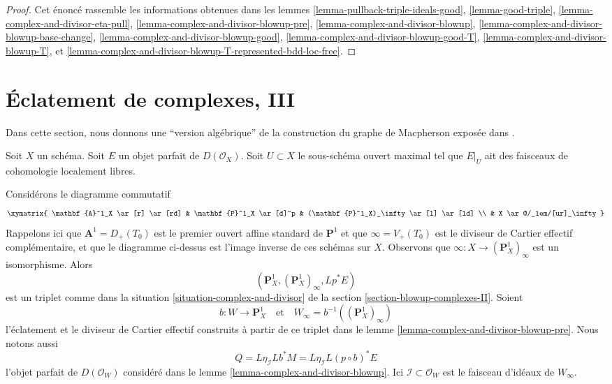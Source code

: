 \begin{proof}
Cet énoncé rassemble les informations obtenues dans les
lemmes \ref{lemma-pullback-triple-ideals-good},
\ref{lemma-good-triple},
\ref{lemma-complex-and-divisor-eta-pull},
\ref{lemma-complex-and-divisor-blowup-pre},
\ref{lemma-complex-and-divisor-blowup},
\ref{lemma-complex-and-divisor-blowup-base-change},
\ref{lemma-complex-and-divisor-blowup-good},
\ref{lemma-complex-and-divisor-blowup-good-T},
\ref{lemma-complex-and-divisor-blowup-T}, et
\ref{lemma-complex-and-divisor-blowup-T-represented-bdd-loc-free}.
\end{proof}










\section{Éclatement de complexes, III}
\label{section-blowup-complexes-III}

\noindent
Dans cette section, nous donnons une ``version algébrique'' de la
construction du graphe de Macpherson exposée dans \cite[section 18.1]{F}.

\medskip\noindent
Soit $X$ un schéma. Soit $E$ un objet parfait de $D(\mathcal{O}_X)$.
Soit $U \subset X$ le sous-schéma ouvert maximal tel que
$E|_U$ ait des faisceaux de cohomologie localement libres.

\medskip\noindent
Considérons le diagramme commutatif
$$
\xymatrix{
\mathbf{A}^1_X \ar[r] \ar[rd] &
\mathbf{P}^1_X \ar[d]^p &
(\mathbf{P}^1_X)_\infty \ar[l] \ar[ld] \\
& X \ar@/_1em/[ur]_\infty
}
$$
Rappelons ici que $\mathbf{A}^1 = D_+(T_0)$ est le premier ouvert
affine standard de $\mathbf{P}^1$ et que $\infty = V_+(T_0)$ est le
diviseur de Cartier effectif complémentaire, et que le diagramme ci-dessus
est l'image inverse de ces schémas sur $X$. Observons que
$\infty : X \to (\mathbf{P}^1_X)_\infty$ est un isomorphisme.
Alors
$$
(\mathbf{P}^1_X, (\mathbf{P}^1_X)_\infty, Lp^*E)
$$
est un triplet comme dans la situation \ref{situation-complex-and-divisor}
de la section \ref{section-blowup-complexes-II}.
Soient
$$
b : W \longrightarrow \mathbf{P}^1_X\quad\text{et}\quad
W_\infty = b^{-1}((\mathbf{P}^1_X)_\infty)
$$
l'éclatement et le diviseur de Cartier effectif construits
à partir de ce triplet dans le
lemme \ref{lemma-complex-and-divisor-blowup-pre}.
Nous notons aussi
$$
Q = L\eta_{\mathcal{I}} Lb^*M = L\eta_\mathcal{I} L(p \circ b)^*E
$$
l'objet parfait de $D(\mathcal{O}_W)$
considéré dans le lemme \ref{lemma-complex-and-divisor-blowup}.
Ici $\mathcal{I} \subset \mathcal{O}_W$ est le faisceau d'idéaux
de $W_\infty$.

